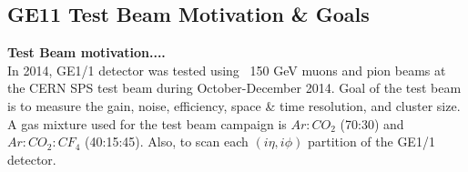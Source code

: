 
\subsection{GE11 Test Beam Motivation \& Goals}
\textbf{Test Beam motivation....}\\
In 2014, GE1/1 detector was tested using ~150 GeV muons and pion beams at the CERN SPS test beam during October-December 2014.
Goal of the test beam is to measure the gain, noise, efficiency, space \& time resolution, and cluster size.
A gas mixture used for the test beam campaign is $Ar:CO_{2}$ (70:30) and $Ar:CO_{2}:CF_{4}$ (40:15:45). Also, to scan each $(i\eta,i\phi)$ partition of the GE1/1 detector.


